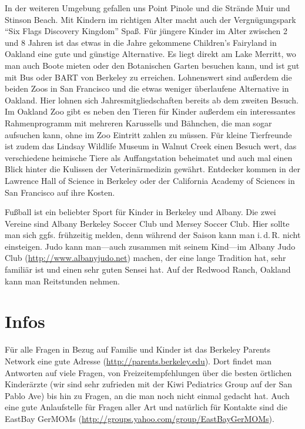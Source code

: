 \documentclass[a4paper]{scrreprt}
\begin{document}
In der weiteren Umgebung gefallen uns Point Pinole und die Strände Muir und Stinson Beach. Mit Kindern im richtigen Alter macht auch der Vergnügungspark "`Six Flags Discovery Kingdom"' Spaß.
Für jüngere Kinder im Alter zwischen 2 und 8 Jahren ist das etwas in die Jahre gekommene Children's Fairyland in Oakland eine gute und günstige Alternative. Es liegt direkt am Lake Merritt, wo man auch Boote mieten oder den Botanischen Garten besuchen kann, und ist gut mit Bus oder BART von Berkeley zu erreichen.
Lohnenswert sind außerdem die beiden Zoos in San Francisco und die etwas weniger überlaufene Alternative in Oakland. Hier lohnen sich Jahresmitgliedschaften bereits ab dem zweiten Besuch. Im Oakland Zoo gibt es neben den Tieren für Kinder außerdem ein interessantes Rahmenprogramm mit mehreren Karussells und Bähnchen, die man sogar aufsuchen kann, ohne im Zoo Eintritt zahlen zu müssen. Für kleine Tierfreunde ist zudem das Lindsay Wildlife Museum in Walnut Creek einen Besuch wert, das verschiedene heimische Tiere als Auffangstation beheimatet und auch mal einen Blick hinter die Kulissen der Veterinärmedizin gewährt. Entdecker kommen in der Lawrence Hall of Science in Berkeley oder der California Academy of Sciences in San Francisco auf ihre Kosten.

Fußball ist ein beliebter Sport für Kinder in Berkeley und Albany. Die zwei Vereine sind Albany Berkeley Soccer Club und Mersey Soccer Club. Hier sollte man sich ggfs. frühzeitig melden, denn während der Saison kann man i.\,d.\,R. nicht einsteigen. Judo kann man---auch zusammen mit seinem Kind---im Albany Judo Club (\url{http://www.albanyjudo.net}) machen, der eine lange Tradition hat, sehr familiär ist und einen sehr guten Sensei hat. Auf der Redwood Ranch, Oakland kann man Reitstunden nehmen.

\section{Infos}

Für alle Fragen in Bezug auf Familie und Kinder ist das Berkeley Parents Network eine gute Adresse (\url{http://parents.berkeley.edu}). Dort findet man Antworten auf viele Fragen, von Freizeitempfehlungen über die besten örtlichen Kinderärzte (wir sind sehr zufrieden mit der Kiwi Pediatrics Group auf der San Pablo Ave) bis hin zu Fragen, an die man noch nicht einmal gedacht hat. Auch eine gute Anlaufstelle für Fragen aller Art und natürlich für Kontakte sind die EastBay GerMOMs (\url{http://groups.yahoo.com/group/EastBayGerMOMs}).
\end{document}
